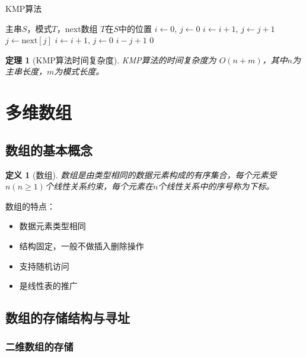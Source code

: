 \documentclass[12pt,a4paper]{amsart}
\newtheorem{definition}{定义}[section]
\newtheorem{theorem}{定理}[section]
\begin{document}
\begin{algorithm}
\caption{KMP算法}
\begin{algorithmic}[1]
\REQUIRE 主串$S$，模式$T$，next数组
\ENSURE $T$在$S$中的位置
\STATE $i \leftarrow 0$, $j \leftarrow 0$
        \STATE $i \leftarrow i + 1$, $j \leftarrow j + 1$
    \ELSE
        \STATE $j \leftarrow \text{next}[j]$
            \STATE $i \leftarrow i + 1$, $j \leftarrow 0$
        \ENDIF
    \ENDIF
\ENDWHILE
{}
    \RETURN $i - j + 1$
\ELSE
    \RETURN $0$
\ENDIF
\end{algorithmic}
\end{algorithm}

\begin{theorem}[KMP算法时间复杂度]
KMP算法的时间复杂度为 $O(n+m)$，其中$n$为主串长度，$m$为模式长度。
\end{theorem}

\section{多维数组}

\subsection{数组的基本概念}

\begin{definition}[数组]
数组是由类型相同的数据元素构成的有序集合，每个元素受$n(n \geq 1)$个线性关系约束，每个元素在$n$个线性关系中的序号称为下标。
\end{definition}

数组的特点：
\begin{itemize}
\item 数据元素类型相同
\item 结构固定，一般不做插入删除操作
\item 支持随机访问
\item 是线性表的推广
\end{itemize}

\subsection{数组的存储结构与寻址}

\subsubsection{二维数组的存储}
\end{document}

